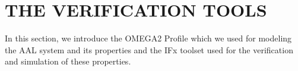 \documentclass[a4paper,twoside]{article}
\def\sysml{\textsc{SysML}}
\def\uml{\textsc{UML}}
\begin{document}



\section{\uppercase{The verification tools}}
\label{sec:tools}
\noindent In this section, we introduce the OMEGA2 Profile which we used for modeling the AAL system and its properties and the IFx toolset used for the verification and simulation of these properties. 
\end{document}
